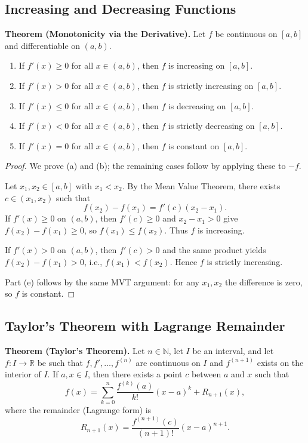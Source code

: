 \documentclass[12pt,a4paper]{article}
\theoremstyle{definition}
\newcommand{\R}{\mathbb{R}}
\newcommand{\N}{\mathbb{N}}
\begin{document}
\subsection{Increasing and Decreasing Functions}

\textbf{Theorem (Monotonicity via the Derivative).} Let \(f\) be continuous on \([a,b]\) and differentiable on \((a,b)\).
\begin{enumerate}[label=(\alph*)]
    \item If \(f'(x)\ge0\) for all \(x\in(a,b)\), then \(f\) is increasing on \([a,b]\).
    \item If \(f'(x)>0\) for all \(x\in(a,b)\), then \(f\) is strictly increasing on \([a,b]\).
    \item If \(f'(x)\le0\) for all \(x\in(a,b)\), then \(f\) is decreasing on \([a,b]\).
    \item If \(f'(x)<0\) for all \(x\in(a,b)\), then \(f\) is strictly decreasing on \([a,b]\).
    \item If \(f'(x)=0\) for all \(x\in(a,b)\), then \(f\) is constant on \([a,b]\).
\end{enumerate}

\begin{proof}
We prove (a) and (b); the remaining cases follow by applying these to \(-f\).

Let \(x_1,x_2\in[a,b]\) with \(x_1<x_2\). By the Mean Value Theorem, there exists \(c\in(x_1,x_2)\) such that
\[
f(x_2)-f(x_1) = f'(c)(x_2-x_1).
\]
If \(f'(x)\ge0\) on \((a,b)\), then \(f'(c)\ge0\) and \(x_2-x_1>0\) give \(f(x_2)-f(x_1)\ge0\), so \(f(x_1)\le f(x_2)\). Thus \(f\) is increasing.

If \(f'(x)>0\) on \((a,b)\), then \(f'(c)>0\) and the same product yields \(f(x_2)-f(x_1)>0\), i.e., \(f(x_1)<f(x_2)\). Hence \(f\) is strictly increasing.

Part (e) follows by the same MVT argument: for any \(x_1,x_2\) the difference is zero, so \(f\) is constant.
\end{proof}

\subsection{Taylor's Theorem with Lagrange Remainder}

\textbf{Theorem (Taylor's Theorem).} Let \(n\in\N\), let \(I\) be an interval, and let \(f:I\to\R\) be such that \(f,f',\dots,f^{(n)}\) are continuous on \(I\) and \(f^{(n+1)}\) exists on the interior of \(I\). If \(a,x\in I\), then there exists a point \(c\) between \(a\) and \(x\) such that
\[
f(x) = \sum_{k=0}^{n} \frac{f^{(k)}(a)}{k!}(x-a)^k + R_{n+1}(x),
\]
where the remainder (Lagrange form) is
\[
R_{n+1}(x) = \frac{f^{(n+1)}(c)}{(n+1)!}(x-a)^{n+1}.
\]
\end{document}
